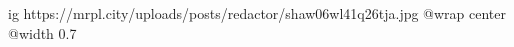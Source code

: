  
 
 
 
 

\ifcmt
  ig https://mrpl.city/uploads/posts/redactor/shaw06wl41q26tja.jpg
  @wrap center
  @width 0.7
\fi
